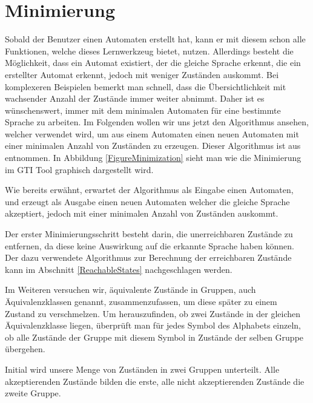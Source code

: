

\chapter{Minimierung}\label{Minimize}

Sobald der Benutzer einen Automaten erstellt hat, kann er mit diesem schon alle
Funktionen, welche dieses Lernwerkzeug bietet, nutzen. Allerdings besteht die
Möglichkeit, dass ein Automat existiert, der die gleiche Sprache erkennt, die ein
erstellter Automat erkennt, jedoch mit weniger Zuständen auskommt. Bei
komplexeren Beispielen bemerkt man schnell, dass die Übersichtlichkeit mit
wachsender Anzahl der Zustände immer weiter abnimmt. Daher ist es wünschenswert,
immer mit dem minimalen Automaten für eine bestimmte Sprache zu arbeiten. Im
Folgenden wollen wir uns jetzt den Algorithmus ansehen, welcher verwendet wird,
um aus einem Automaten einen neuen Automaten mit einer minimalen Anzahl von
Zuständen zu erzeugen. Dieser Algorithmus ist aus \cite{Compilers}
entnommen. In Abbildung \ref{FigureMinimization} sieht man wie die
Minimierung im GTI Tool graphisch dargestellt wird.\vspace{10pt}

Wie bereits erwähnt, erwartet der Algorithmus als Eingabe einen Automaten, und
erzeugt als Ausgabe einen neuen Automaten welcher die gleiche Sprache
akzeptiert, jedoch mit einer minimalen Anzahl von Zuständen
auskommt.\vspace{10pt}

Der erster Minimierungsschritt besteht darin, die unerreichbaren Zustände zu
entfernen, da diese keine Auswirkung auf die erkannte Sprache haben können. Der
dazu verwendete Algorithmus zur Berechnung der erreichbaren Zustände kann im
Abschnitt \ref{ReachableStates} nachgeschlagen werden.\vspace{10pt}

Im Weiteren versuchen wir, äquivalente Zustände in Gruppen, auch
Äquivalenz\-klassen genannt, zusammenzufassen, um diese später zu einem Zustand
zu verschmelzen. Um herauszufinden, ob zwei Zustände in der gleichen
Äquivalenz\-klasse liegen, überprüft man für jedes Symbol des Alphabets
einzeln, ob alle Zustände der Gruppe mit diesem Symbol in Zustände der selben
Gruppe übergehen.\vspace{10pt}

Initial wird unsere Menge von Zuständen in zwei Gruppen unterteilt. Alle
akzeptierenden Zustände bilden die erste, alle nicht akzeptierenden Zustände die
zweite Gruppe.\vspace{10pt}

